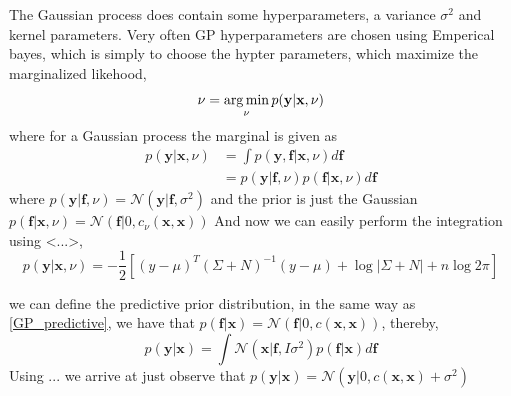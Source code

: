 The Gaussian process does contain some hyperparameters, a variance $\sigma^2$ and kernel parameters. 
Very often GP hyperparameters are chosen using Emperical bayes, which is simply to choose
the hypter parameters, which maximize the marginalized likehood,  
$$\nu = \operatorname*{arg\,min}_{\nu} p(\textbf{y}|\textbf{x}, \nu)$$
where for a Gaussian process the marginal is given as 
\begin{align*}
    p(\textbf{y}|\textbf{x}, \nu) &= \int  p(\textbf{y}, \textbf{f}|\textbf{x}, \nu) d\textbf{f}\\
    &= p(\textbf{y}|\textbf{f},\nu)p(\textbf{f}|\textbf{x},\nu) d\textbf{f}
\end{align*}
where  $p(\textbf{y}|\textbf{f},\nu) = \mathcal{N}(\textbf{y}|\textbf{f},\sigma^2)$ and the prior is
just the Gaussian $p(\textbf{f}|\textbf{x},\nu) = \mathcal{N}(\textbf{f}|0, c_{\nu}(\textbf{x}, \textbf{x}))$
And now we can easily perform the integration using <...>, 
$$p(\textbf{y}|\textbf{x}, \nu) = -\frac{1}{2}[(y-\mu)^T (\Sigma+N)^{-1}(y-\mu)+ \log |\Sigma+N|+n \log 2\pi]$$

we can define the predictive prior distribution, in the same way as \eqref{GP_predictive}, we have that
$p(\textbf{f}| \textbf{x}) = \mathcal{N}(\textbf{f}|0, c(\textbf{x},\textbf{x}))$, thereby, 
\begin{equation}\label{GP_predictive_prior}
    p(\textbf{y}|\textbf{x}) = \int \mathcal{N}(\textbf{x}|\textbf{f}, I\sigma^2) p(\textbf{f}|\textbf{x})d\textbf{f}
\end{equation}
Using ... we arrive at 
just observe that $p(\textbf{y}|\textbf{x}) = \mathcal{N}(\textbf{y}|0, c(\textbf{x},\textbf{x})+ \sigma^2)$




